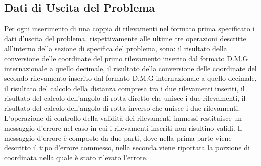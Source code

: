 \documentclass{article}
\begin{document}
\subsection{Dati di Uscita del Problema}
Per ogni inserimento di una coppia di rilevamenti nel formato prima specificato i dati d'uscita del problema, rispettivamente alle ultime tre operazioni descritte all'interno della sezione di specifica del problema, sono: il risultato della conversione delle coordinate del primo rilevamento inserito dal formato D.M.G internazionale a quello decimale, il risultato della conversione delle coordinate del secondo rilevamento inserito dal formato D.M.G internazionale a quello decimale, il risultato del calcolo della distanza compresa tra i due rilevamenti inseriti, il risultato del calcolo dell'angolo di rotta diretto che unisce i due rilevamenti, il risultato del calcolo dell'angolo di rotta inverso che unisce i due rilevamenti. 
L'operazione di controllo della validità dei rilevamenti immessi restituisce un messaggio d'errore nel caso in cui i rilevamenti inseriti non risultino validi. Il messaggio d'errore è composto da due parti, dove nella prima parte viene descritto il tipo d'errore commesso, nella seconda viene riportata la porzione di coordinata nella quale è stato rilevato l'errore. 
\end{document}
